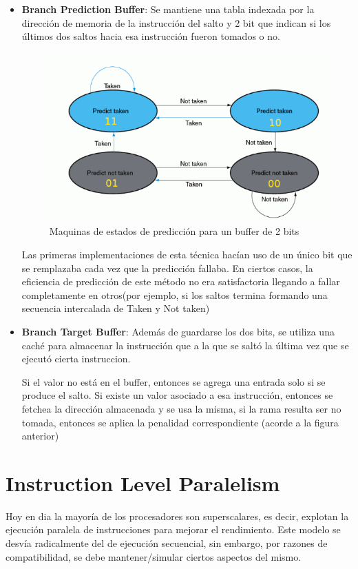 \begin{itemize}
	\item\textbf{Branch Prediction Buffer}: Se mantiene una tabla indexada por la dirección de memoria de la instrucción del salto y 2 bit que indican si los últimos dos saltos hacia esa instrucción fueron tomados o no.
	
	\begin{figure}[h]
		\centering
		\includegraphics[width=0.7\linewidth]{imagenes/2bit-buffer-prediction}
		\caption{Maquinas de estados de predicción para un buffer de 2 bits}
		\label{fig:2bit-buffer-prediction}
	\end{figure}

	Las primeras implementaciones de esta técnica hacían uso de un único bit que se remplazaba cada vez que la predicción fallaba. En ciertos casos, la eficiencia de predicción de este método no era satisfactoria llegando a fallar completamente en otros(por ejemplo, si los saltos termina formando una secuencia intercalada de Taken y Not taken)
	\item \textbf{Branch Target Buffer}: Además de guardarse los dos bits, se utiliza una caché para almacenar la instrucción que a la que se saltó la última vez que se ejecutó cierta instruccion. 
	
	Si el valor no está en el buffer, entonces se agrega una entrada solo si se produce el salto. Si existe un valor asociado a esa instrucción, entonces se fetchea la dirección almacenada y se usa la misma, si la rama resulta ser no tomada, entonces se aplica la penalidad correspondiente (acorde a la figura anterior)
\end{itemize}

\newpage
\section{}


\section{Instruction Level Paralelism}
Hoy en dia la mayoría de los procesadores son superscalares, es decir, explotan la ejecución paralela de instrucciones para mejorar el rendimiento. Este modelo se desvía radicalmente del de ejecución secuencial, sin embargo, por razones de compatibilidad, se debe mantener/simular ciertos aspectos del mismo.

